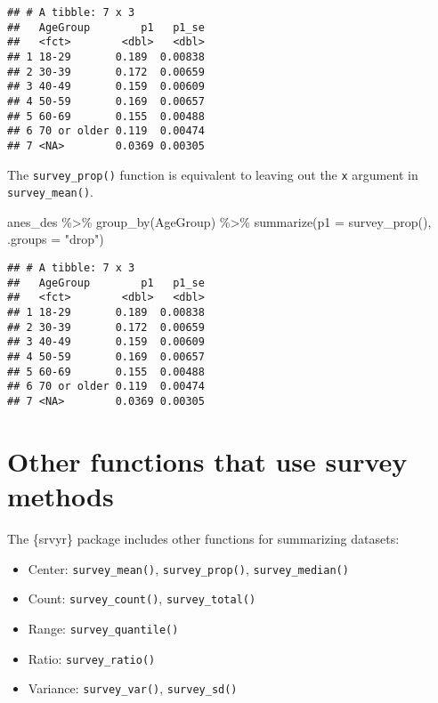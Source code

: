 \documentclass[
]{krantz}
\makeatletter
\newenvironment{Shaded}{\begin{snugshade}}{\end{snugshade}}
\newcommand{\AttributeTok}[1]{\textcolor[rgb]{0.61,0.61,0.61}{#1}}
\newcommand{\FunctionTok}[1]{\textcolor[rgb]{0,0,0}{#1}}
\newcommand{\NormalTok}[1]{#1}
\newcommand{\SpecialCharTok}[1]{\textcolor[rgb]{0,0,0}{#1}}
\newcommand{\StringTok}[1]{\textcolor[rgb]{0.5,0.5,0.5}{#1}}
\providecommand{\tightlist}{%
  \setlength{\itemsep}{0pt}\setlength{\parskip}{0pt}}
\newenvironment{kframe}{%
\medskip{}
\setlength{\fboxsep}{.8em}
 \def\at@end@of@kframe{}%
 \ifinner\ifhmode%
  \def\at@end@of@kframe{\end{minipage}}%
  \begin{minipage}{\columnwidth}%
 \fi\fi%
 \def\FrameCommand##1{\hskip\@totalleftmargin \hskip-\fboxsep
 \colorbox{shadecolor}{##1}\hskip-\fboxsep
     \hskip-\linewidth \hskip-\@totalleftmargin \hskip\columnwidth}%
 \MakeFramed {\advance\hsize-\width
   \@totalleftmargin\z@ \linewidth\hsize
   \@setminipage}}%
 {\par\unskip\endMakeFramed%
 \at@end@of@kframe}
\renewenvironment{Shaded}{\begin{kframe}}{\end{kframe}}
\makeatother
\begin{document}
\begin{verbatim}
## # A tibble: 7 x 3
##   AgeGroup        p1   p1_se
##   <fct>        <dbl>   <dbl>
## 1 18-29       0.189  0.00838
## 2 30-39       0.172  0.00659
## 3 40-49       0.159  0.00609
## 4 50-59       0.169  0.00657
## 5 60-69       0.155  0.00488
## 6 70 or older 0.119  0.00474
## 7 <NA>        0.0369 0.00305
\end{verbatim}

The \texttt{survey\_prop()} function is equivalent to leaving out the \texttt{x} argument in \texttt{survey\_mean()}.

\begin{Shaded}
\begin{Highlighting}[]
\NormalTok{anes\_des }\SpecialCharTok{\%\textgreater{}\%}
  \FunctionTok{group\_by}\NormalTok{(AgeGroup) }\SpecialCharTok{\%\textgreater{}\%}
  \FunctionTok{summarize}\NormalTok{(}\AttributeTok{p1 =} \FunctionTok{survey\_prop}\NormalTok{(),}
            \AttributeTok{.groups =} \StringTok{"drop"}\NormalTok{)}
\end{Highlighting}
\end{Shaded}

\begin{verbatim}
## # A tibble: 7 x 3
##   AgeGroup        p1   p1_se
##   <fct>        <dbl>   <dbl>
## 1 18-29       0.189  0.00838
## 2 30-39       0.172  0.00659
## 3 40-49       0.159  0.00609
## 4 50-59       0.169  0.00657
## 5 60-69       0.155  0.00488
## 6 70 or older 0.119  0.00474
## 7 <NA>        0.0369 0.00305
\end{verbatim}

\hypertarget{other-functions-that-use-survey-methods}{%
\section{Other functions that use survey methods}\label{other-functions-that-use-survey-methods}}

The \{srvyr\} package includes other functions for summarizing datasets:

\begin{itemize}
\tightlist
\item
  Center: \texttt{survey\_mean()}, \texttt{survey\_prop()}, \texttt{survey\_median()}
\item
  Count: \texttt{survey\_count()}, \texttt{survey\_total()}
\item
  Range: \texttt{survey\_quantile()}
\item
  Ratio: \texttt{survey\_ratio()}
\item
  Variance: \texttt{survey\_var()}, \texttt{survey\_sd()}
\end{itemize}
\end{document}
